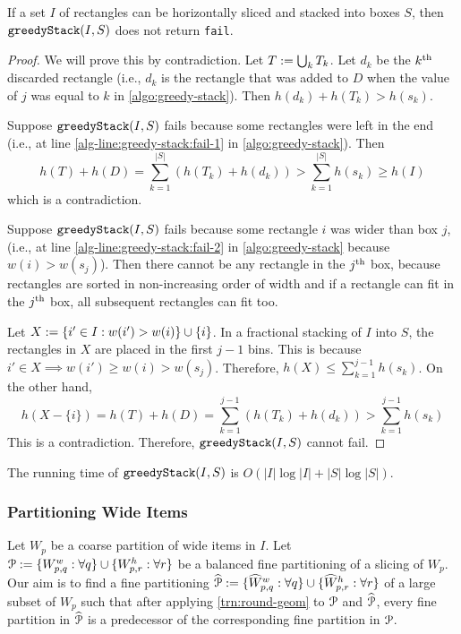 \begin{lemma}
\label{lem:greedy-stack-nofail}
If a set $I$ of rectangles can be horizontally sliced and stacked into boxes $S$,
then $\operatorname{\mathtt{greedyStack}}(I, S)$ does not return \texttt{fail}.
\end{lemma}
\begin{proof}
We will prove this by contradiction.
Let $T := \bigcup_k T_k$.
Let $d_k$ be the $k^{\textrm{th}}$ discarded rectangle
(i.e., $d_k$ is the rectangle that was added to $D$
when the value of $j$ was equal to $k$ in \cref{algo:greedy-stack}).
Then $h(d_k) + h(T_k) > h(s_k)$.

Suppose $\operatorname{\mathtt{greedyStack}}(I, S)$ fails because some rectangles were left in the end
(i.e., at line \ref{alg-line:greedy-stack:fail-1} in \cref{algo:greedy-stack}). Then
\[ h(T) + h(D) = \sum_{k=1}^{|S|} (h(T_k) + h(d_k))
> \sum_{k=1}^{|S|} h(s_k) \ge h(I) \]
which is a contradiction.

Suppose $\operatorname{\mathtt{greedyStack}}(I, S)$ fails because some rectangle $i$ was wider than box $j$,
(i.e., at line \ref{alg-line:greedy-stack:fail-2}
in \cref{algo:greedy-stack} because $w(i) > w(s_j)$).
Then there cannot be any rectangle in the $j^{\textrm{th}}$ box, because rectangles are sorted
in non-increasing order of width and if a rectangle can fit in the $j^{\textrm{th}}$ box,
all subsequent rectangles can fit too.

Let $X := \{i' \in I: w(i') > w(i)\} \cup \{i\}$.
In a fractional stacking of $I$ into $S$, the rectangles in $X$ are placed in the first $j-1$ bins.
This is because $i' \in X \implies w(i') \ge w(i) > w(s_j)$.
Therefore, $h(X) \le \sum_{k=1}^{j-1} h(s_k)$. On the other hand,
\[ h(X-\{i\}) = h(T) + h(D) = \sum_{k=1}^{j-1} (h(T_k) + h(d_k)) > \sum_{k=1}^{j-1} h(s_k) \]
This is a contradiction. Therefore, $\operatorname{\mathtt{greedyStack}}(I, S)$ cannot fail.
\end{proof}

\begin{claim}
The running time of $\operatorname{\mathtt{greedyStack}}(I, S)$ is $O(|I|\log|I| + |S|\log|S|)$.
\end{claim}

\subsubsection{Partitioning Wide Items}
\label{sec:gv-rbbp:part-wide-details}

Let $W_p$ be a coarse partition of wide items in $I$.
Let $\mathcal{P} := \{W_{p,q}^w: \forall q\} \cup \{W_{p,r}^h: \forall r\}$ be
a balanced fine partitioning of a slicing of $W_p$.
Our aim is to find a fine partitioning
$\widehat{\mathcal{P}} := \{\widehat{W}_{p,q}^w: \forall q\} \cup \{\widehat{W}_{p,r}^h: \forall r\}$
of a large subset of $W_p$ such that
after applying \cref{trn:round-geom} to $\mathcal{P}$ and $\widehat{\mathcal{P}}$,
every fine partition in $\widehat{\mathcal{P}}$ is a predecessor of
the corresponding fine partition in $\mathcal{P}$.

